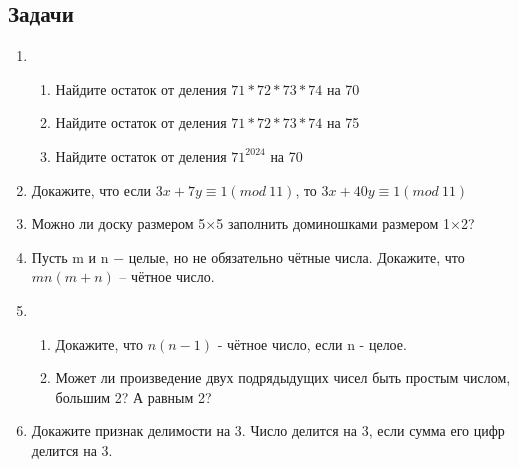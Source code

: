 \documentclass[a4paper,12pt]{article}
\begin{document}
    \subsection*{Задачи}
    \begin{enumerate}
        \item 
        \begin{enumerate}
            \item Найдите остаток от деления $71 * 72 * 73 * 74$ на 70
            \item Найдите остаток от деления $71 * 72 * 73 * 74$ на 75
            \item Найдите остаток от деления $71^{2024}$ на 70
        \end{enumerate}
    \item Докажите, что если $3x + 7y \equiv 1 (mod \ 11)$, то $3x + 40y \equiv 1 (mod \ 11)$
    \item  Можно ли доску размером 5×5 заполнить доминошками размером 1×2?
    \item Пусть m и n $-$ целые, но не обязательно чётные числа. Докажите, что  $mn(m + n)$  – чётное число.
    \item
        \begin{enumerate}
            \item Докажите, что $n(n-1)$ - чётное число, если n - целое.
            \item Может ли произведение двух подрядыдущих чисел быть простым числом, большим 2? А равным 2?
        \end{enumerate}
    \item Докажите признак делимости на 3. Число делится на 3, если сумма его цифр делится на 3.
    \end{enumerate}
\end{document}
